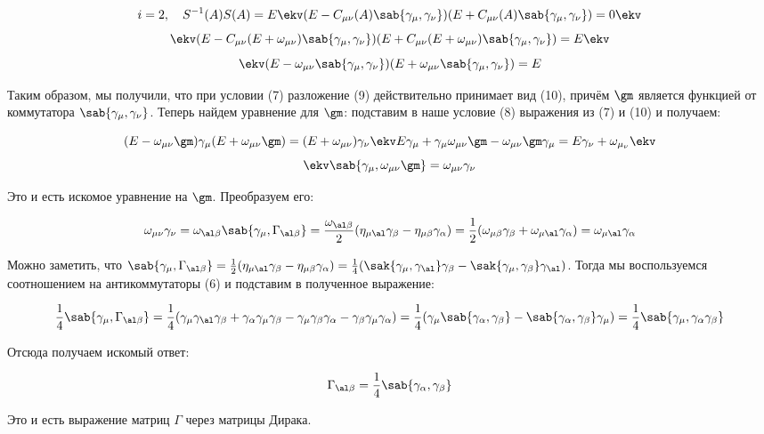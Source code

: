 \documentclass[12pt]{kiarticle}
\begin{document}
\[ 
i = 2, \quad S^{-1}(A)S(A) = E \ekv (E - C_{\mu\nu}(A)\sab{\gamma_\mu,\gamma_\nu})(E + C_{\mu\nu}(A)\sab{\gamma_\mu,\gamma_\nu}) = 0 \ekv
 \]
 \[ 
 \ekv (E - C_{\mu\nu}(E + \omega_{\mu\nu})\sab{\gamma_\mu,\gamma_\nu})(E + C_{\mu\nu}(E + \omega_{\mu\nu})\sab{\gamma_\mu,\gamma_\nu}) = E \ekv
  \]
  \begin{equation}\label{}
  \ekv (E - \omega_{\mu\nu}\sab{\gamma_\mu,\gamma_\nu})(E +  \omega_{\mu\nu}\sab{\gamma_\mu,\gamma_\nu}) = E
  \end{equation}

Таким образом, мы получили, что при условии (7) разложение (9) действительно принимает вид (10), причём $ \gm $ является функцией от коммутатора $ \sab{\gamma_\mu,\gamma_\nu} $. Теперь найдем уравнение для $ \gm $: подставим в наше условие (8) выражения из (7) и (10) и получаем:

\begin{equation*}\label{}
(E - \omega_{\mu\nu}\gm)\gamma_\mu(E +  \omega_{\mu\nu}\gm) = (E + \omega_{\mu\nu})\gamma_\nu  \ekv 
E \gamma_\mu + \gamma_\mu \omega_{\mu\nu}\gm -  \omega_{\mu\nu}\gm\gamma_\mu = E\gamma_\nu + \omega_{\mu_\nu} \ekv 
\end{equation*}
\begin{equation}\label{}
\ekv \sab{\gamma_\mu, \omega_{\mu\nu}\gm } = \omega_{\mu\nu}\gamma_\nu 
\end{equation}

Это и есть искомое уравнение на $ \gm $. Преобразуем его:

\begin{equation}\label{}
\omega_{\mu\nu}\gamma_\nu  = \omega_{\al\beta}\sab{\gamma_\mu, \Gamma_{\al\beta}} =  \frac{\omega_{\al\beta}}{2}(\eta_{\mu\al}\gamma_\beta-\eta_{\mu\beta}\gamma_\alpha) = \frac{1}{2} (\omega_{\mu\beta}\gamma_\beta + \omega_{\mu\al}\gamma_\alpha) = \omega_{\mu\al}\gamma_\alpha
\end{equation}

Можно заметить, что $ \sab{\gamma_\mu, \Gamma_{\al\beta}} = \frac{1}{2}(\eta_{\mu\al}\gamma_\beta-\eta_{\mu\beta}\gamma_\alpha) = \frac{1}{4}(\sak{\gamma_\mu, \gamma_\al}\gamma_\beta - \sak{\gamma_\mu, \gamma_\beta}\gamma_\al)$. Тогда мы воспользуемся соотношением на антикоммутаторы (6) и подставим в полученное выражение:

\begin{equation}\label{}
\frac{1}{4}\sab{\gamma_\mu, \Gamma_{\al\beta}} = \frac{1}{4}(\gamma_\mu\gamma_\al \gamma_\beta + \gamma_\alpha\gamma_\mu\gamma_\beta - \gamma_\mu \gamma_\beta \gamma_\alpha - \gamma_\beta\gamma_\mu\gamma_\alpha ) = \frac{1}{4} (\gamma_\mu\sab{\gamma_\alpha, \gamma_\beta} -  \sab{\gamma_\alpha, \gamma_\beta} \gamma_\mu ) = \frac{1}{4}\sab{\gamma_\mu, \gamma_\alpha \gamma_\beta}
\end{equation}

Отсюда получаем искомый ответ: 

\begin{equation}\label{}
\Gamma_{\al\beta} =  \dfrac{1}{4} \sab{ \gamma_\alpha, \gamma_\beta}
\end{equation}

Это и есть выражение матриц $ \Gamma $ через матрицы Дирака.
\end{document}
